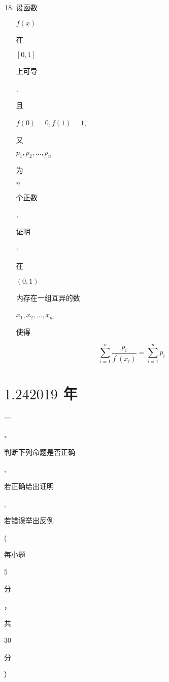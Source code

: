 \documentclass[10pt]{article}
\begin{document}
\begin{enumerate}
  \setcounter{enumi}{17}
  \item \begin{CJK}{UTF8}{mj}设函数\end{CJK} $f(x)$ \begin{CJK}{UTF8}{mj}在\end{CJK} $[0,1]$ \begin{CJK}{UTF8}{mj}上可导\end{CJK}, \begin{CJK}{UTF8}{mj}且\end{CJK} $f(0)=0, f(1)=1$, \begin{CJK}{UTF8}{mj}又\end{CJK} $p_{1}, p_{2}, \ldots, p_{n}$ \begin{CJK}{UTF8}{mj}为\end{CJK} $n$ \begin{CJK}{UTF8}{mj}个正数\end{CJK}, \begin{CJK}{UTF8}{mj}证明\end{CJK}: \begin{CJK}{UTF8}{mj}在\end{CJK} $(0,1)$ \begin{CJK}{UTF8}{mj}内存在一组互异的数\end{CJK} $x_{1}, x_{2}, \ldots, x_{n}$, \begin{CJK}{UTF8}{mj}使得\end{CJK}
\end{enumerate}
$$
\sum_{i=1}^{n} \frac{p_{i}}{f^{\prime}\left(x_{i}\right)}=\sum_{i=1}^{n} p_{i}
$$

\section{$1.242019$ 年}
\begin{CJK}{UTF8}{mj}一\end{CJK}、\begin{CJK}{UTF8}{mj}判断下列命题是否正确\end{CJK}, \begin{CJK}{UTF8}{mj}若正确给出证明\end{CJK}, \begin{CJK}{UTF8}{mj}若错误举出反例\end{CJK} (\begin{CJK}{UTF8}{mj}每小题\end{CJK} 5 \begin{CJK}{UTF8}{mj}分\end{CJK}，\begin{CJK}{UTF8}{mj}共\end{CJK} 30 \begin{CJK}{UTF8}{mj}分\end{CJK}）
\end{document}
